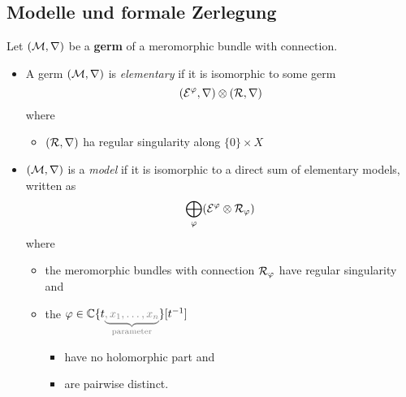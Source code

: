 \subsection{Modelle und formale Zerlegung}%
\begin{defn}
  Let $(\mathcal{M},\nabla)$ be a \textbf{germ} of a meromorphic bundle with
  connection.
  \begin{itemize}
    \item A germ $(\mathcal{M},\nabla)$ is \emph{elementary} if it is isomorphic to
      some germ
      \[
        (\mathcal{E}^\varphi,\nabla)\otimes(\mathcal{R},\nabla)
      \]
      where
      \begin{itemize}
        \item $(\mathcal{R},\nabla)$ ha regular singularity along $\{0\}\times X$
      \end{itemize}
    \item $(\mathcal{M},\nabla)$ is a \emph{model} if it is isomorphic to a direct sum
      of elementary models, written as
      \[
        \bigoplus_\varphi(\mathcal{E}^\varphi\otimes\mathcal{R}_\varphi)
      \]
      where
      \begin{itemize}
        \item the meromorphic bundles with connection $\mathcal{R}_\varphi$ have regular
          singularity and
        \item the
          $\phi\in\C\{t\textcolor{gray}{\underset{\text{parameter}}
            {\underbrace{,x_1,\ldots,x_n}}}\}[t^{-1}]$
          \begin{itemize}
            \item have no holomorphic part and
            \item are pairwise distinct.
          \end{itemize}
      \end{itemize}
  \end{itemize}
  \begin{comment}
    \begin{itemize}
      \item We will say that a model is \emph{good} if,
        \begin{itemize}
          \item for all $\phi\neq\psi$
            \begin{itemize}
              \item such that $\cR_\phi$, $\cR_\psi$ are nonzero,
            \end{itemize}
            the order of the pole along $t=0$ of $(\phi-\psi)(t,x)$ does not
            depend on $x$ being in some neighbourhood of $x^o$.
        \end{itemize}
    \end{itemize}
  \end{comment}
\end{defn}
